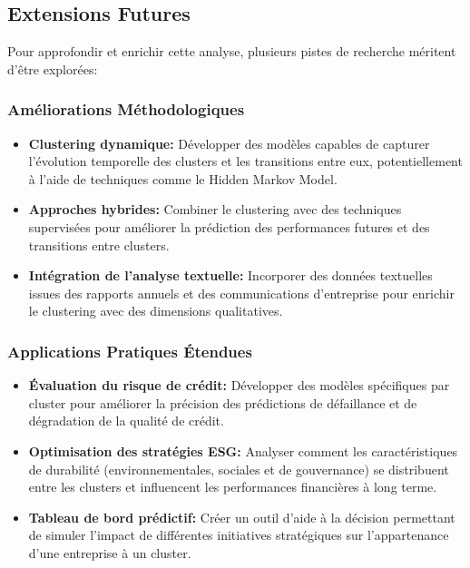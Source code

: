 \subsection{Extensions Futures}
Pour approfondir et enrichir cette analyse, plusieurs pistes de recherche méritent d'être explorées:

\subsubsection{Améliorations Méthodologiques}
\begin{itemize}
    \item \textbf{Clustering dynamique:} Développer des modèles capables de capturer l'évolution temporelle des clusters et les transitions entre eux, potentiellement à l'aide de techniques comme le Hidden Markov Model.
    
    \item \textbf{Approches hybrides:} Combiner le clustering avec des techniques supervisées pour améliorer la prédiction des performances futures et des transitions entre clusters.
    
    \item \textbf{Intégration de l'analyse textuelle:} Incorporer des données textuelles issues des rapports annuels et des communications d'entreprise pour enrichir le clustering avec des dimensions qualitatives.
\end{itemize}

\subsubsection{Applications Pratiques Étendues}
\begin{itemize}
    \item \textbf{Évaluation du risque de crédit:} Développer des modèles spécifiques par cluster pour améliorer la précision des prédictions de défaillance et de dégradation de la qualité de crédit.
    
    \item \textbf{Optimisation des stratégies ESG:} Analyser comment les caractéristiques de durabilité (environnementales, sociales et de gouvernance) se distribuent entre les clusters et influencent les performances financières à long terme.
    
    \item \textbf{Tableau de bord prédictif:} Créer un outil d'aide à la décision permettant de simuler l'impact de différentes initiatives stratégiques sur l'appartenance d'une entreprise à un cluster.
\end{itemize}

